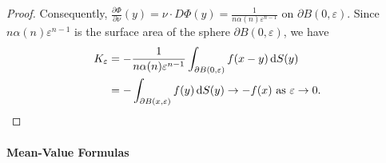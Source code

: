 \begin{proof}
  Consequently, \( \frac{\partial \Phi}{\partial \nu}(y) = \nu \cdot D \Phi(y) = \frac{1}{n \alpha(n) \varepsilon^{n - 1}} \) on \( \partial B(0, \varepsilon) \).
  Since \( n \alpha(n) \varepsilon^{n - 1} \) is the surface area of the sphere \( \partial B(0, \varepsilon) \), we have
  \begin{align*}
    K_{\varepsilon} &= -\frac{1}{n \alpha(n)\varepsilon^{n - 1}}\int_{\partial B(0, \varepsilon)} f(x - y)\mathop{}\!\mathrm{d} S(y)\\
                    &= - \int_{\partial B(x, \varepsilon)} f(y) \mathop{}\!\mathrm{d} S(y)\to - f(x) \text{ as } \varepsilon \to 0.
  \end{align*}
\end{proof}

\paragraph{Mean-Value Formulas}

